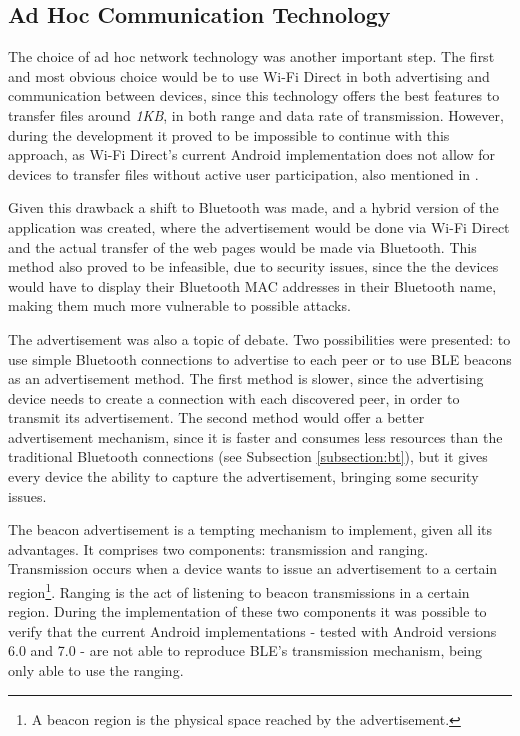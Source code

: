 \subsection{Ad Hoc Communication Technology}

The choice of ad hoc network technology was another important step. The first and most obvious choice would be to use Wi-Fi Direct in both advertising and communication between devices, since this technology offers the best features to transfer files around \textit{1KB}, in both range and data rate of transmission. However, during the development it proved to be impossible to continue with this approach, as Wi-Fi Direct's current Android implementation does not allow for devices to transfer files without active user participation, also mentioned in \cite{bwmesh}.

Given this drawback a shift to Bluetooth was made, and a hybrid version of the application was created, where the advertisement would be done via Wi-Fi Direct and the actual transfer of the web pages would be made via Bluetooth. This method also proved to be infeasible, due to security issues, since the the devices would have to display their Bluetooth MAC addresses in their Bluetooth name, making them much more vulnerable to possible attacks.

The advertisement was also a topic of debate. Two possibilities were presented: to use simple Bluetooth connections to advertise to each peer or to use \gls{BLE} beacons as an advertisement method. The first method is slower, since the advertising device needs to create a connection with each discovered peer, in order to transmit its advertisement. The second method would offer a better advertisement mechanism, since it is faster and consumes less resources than the traditional Bluetooth connections (see Subsection \ref{subsection:bt}), but it gives every device the ability to capture the advertisement, bringing some security issues.

The beacon advertisement is a tempting mechanism to implement, given all its advantages. It comprises two components: transmission and ranging. Transmission occurs when a device wants to issue an advertisement to a certain region\footnote{A beacon region is the physical space reached by the advertisement.}. Ranging is the act of listening to beacon transmissions in a certain region. During the implementation of these two components it was possible to verify that the current Android implementations - tested with Android versions 6.0 and 7.0 - are not able to reproduce \gls{BLE}'s transmission mechanism, being only able to use the ranging.

